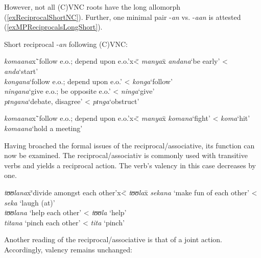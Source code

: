 However, not all (C)VNC roots have the long allomorph (\ref{exReciprocalShortNC}). Further, one minimal pair -\textit{an} vs. -\textit{aan} is attested (\ref{exMPReciprocalsLongShort}).
\begin{exe}
	\ex \label{exReciprocalShortNC} Short reciprocal -\textit{an} following (C)VNC:
	\begin{tabbing}
		\textit{komaana}x\=`follow e.o.; depend upon e.o.'x\= < \textit{manya}x\=\kill%
		\textit{andana}\>`be early'\> < \textit{anda}\>`start'\\
		\textit{kongana}\>`follow e.o.; depend upon e.o.'\> < \textit{konga}\>\lq follow'\\
		\textit{ningana}\>`give e.o.; be opposite e.o.'\> < \textit{ninga}\>`give'\\
		\textit{pɪngana}\>`debate, disagree'\> < \textit{pɪnga}\>`obstruct'
	\end{tabbing}
	\ex \label{exMPReciprocalsLongShort}
	\begin{tabbing}
		\textit{komaana}x\=`follow e.o.; depend upon e.o.'x\= < \textit{manya}x\=\kill%
		\textit{komana}\>`fight'\> < \textit{koma}\>`hit' \\
		\textit{komaana}\>`hold a meeting'
	\end{tabbing}
\end{exe}

Having broached the formal issues of the reciprocal/associative, its function can now be examined. The reciprocal/associativ is commonly used with transitive verbs and yields a reciprocal action. The verb's valency in this case decreases by one.

\begin{exe}
	\ex
	\begin{tabbing}
		\textit{tʊʊlana}x\=\lq divide amongst each other'x\= < \textit{tʊʊla}x\=\kill%
		\textit{sekana} \> \lq make fun of each other' \> < \textit{seka} \> \lq laugh (at)'\\
		\textit{tʊʊlana} \> \lq help each other' \> < \textit{tʊʊla} \> \lq help'\\
		\textit{titana}\> \lq pinch each other' \> < \textit{tita} \> \lq pinch'
	\end{tabbing} 
\end{exe}

Another reading of the reciprocal/associative is that of a joint action. Accordingly, valency remains unchanged:

